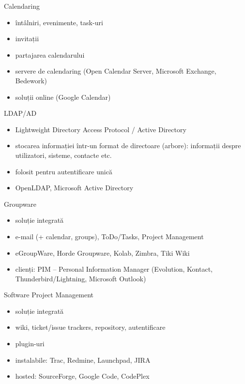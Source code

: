 \documentclass{beamer}
\begin{document}
\begin{frame}{Calendaring}
  \begin{itemize}
    \item întâlniri, evenimente, task-uri
    \item invitații
    \item partajarea calendarului
    \item servere de calendaring (Open Calendar Server, Microsoft Exchange,
    Bedework)
    \item soluții online (Google Calendar)
  \end{itemize}
\end{frame}

\begin{frame}{LDAP/AD}
  \begin{itemize}
    \item Lightweight Directory Access Protocol / Active Directory
    \item stocarea informației într-un format de directoare (arbore):
    informații despre utilizatori, sisteme, contacte etc.
    \item folosit pentru autentificare unică
    \item OpenLDAP, Microsoft Active Directory
  \end{itemize}
\end{frame}

\begin{frame}{Groupware}
  \begin{itemize}
    \item soluție integrată
    \item e-mail (+ calendar, groups), ToDo/Tasks, Project Management
    \item eGroupWare, Horde Groupware, Kolab, Zimbra, Tiki Wiki
    \item clienți: PIM -- Personal Information Manager (Evolution, Kontact,
    Thunderbird/Lightning, Microsoft Outlook)
  \end{itemize}
\end{frame}

\begin{frame}{Software Project Management}
  \begin{itemize}
    \item soluție integrată
    \item wiki, ticket/issue trackers, repository, autentificare
    \item plugin-uri
    \item instalabile: Trac, Redmine, Launchpad, JIRA
    \item hosted: SourceForge, Google Code, CodePlex
  \end{itemize}
\end{frame}
\end{document}
